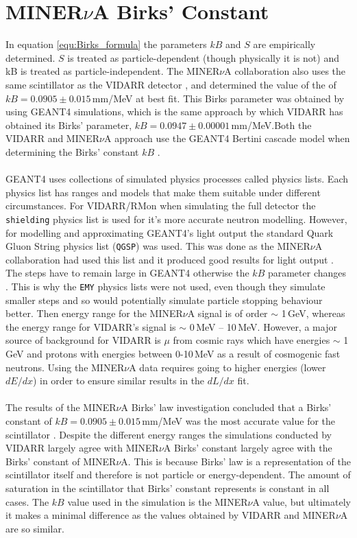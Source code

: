\section{MINER$\nu$A Birks' Constant}\label{sec:GEANT4Simulation_MINERvABirksConstant}
In equation \ref{equ:Birks_formula} the parameters $kB$ and $S$ are empirically determined. $S$ is treated as particle-dependent (though physically it is not) and kB is treated as particle-independent. The MINER$\nu$A collaboration \cite{aliaga_2015} also uses the same scintillator as the VIDARR detector \cite{aliaga_2014}, and determined the value of the of $kB = 0.0905 \pm 0.015$\,mm/MeV at best fit. This Birks parameter was obtained by using GEANT4 simulations, which is the same approach by which VIDARR has obtained its Birks' parameter, $kB = 0.0947 \pm 0.00001$\,mm/MeV.Both the VIDARR and MINER$\nu$A approach use the GEANT4 Bertini cascade model when determining the Birks' constant $kB$ \cite{Heikkinen_2003}. 
\\\\GEANT4 uses collections of simulated physics processes called physics lists. Each physics list has ranges and models that make them suitable under different circumstances. For VIDARR/RMon when simulating the full detector the \texttt{shielding} physics list is used for it's more accurate neutron modelling. However, for modelling and approximating GEANT4's light output the standard Quark Gluon String physics list (\texttt{QGSP}) was used. This was done as the MINER$\nu$A collaboration had used this list and it produced good results for light output \cite{Patrick_2018}. The steps have to remain large in GEANT4 otherwise the $kB$ parameter changes \cite{aliaga_2015}. This is why the \texttt{EMY} physics lists were not used, even though they simulate smaller steps and so would potentially simulate particle stopping behaviour better. Then energy range for the MINER$\nu$A signal is of order $\sim$ 1\,GeV, whereas the energy range for VIDARR's signal is $\sim$ 0\,MeV -- 10\,MeV. However, a major source of background for VIDARR is $\mu$ from cosmic rays which have energies $\sim$ 1\,GeV and protons with energies between 0-10\,MeV as a result of cosmogenic fast neutrons. Using the MINER$\nu$A data requires going to higher energies (lower $dE/dx$) in order to ensure similar results in the $dL/dx$ fit.  
\\\\The results of the MINER$\nu$A Birks' law investigation concluded that a Birks' constant of $kB = 0.0905 \pm 0.015$\,mm/MeV was the most accurate value for the scintillator \cite{aliaga_2015}. Despite the different energy ranges the simulations conducted by VIDARR largely agree with MINER$\nu$A Birks' constant largely agree with the Birks' constant of MINER$\nu$A. This is because Birks' law is a representation of the scintillator itself and therefore is not particle or energy-dependent. The amount of saturation in the scintillator that Birks' constant represents is constant in all cases. The $kB$ value used in the simulation is the MINER$\nu$A value, but ultimately it makes a minimal difference as the values obtained by VIDARR and MINER$\nu$A are so similar. 
